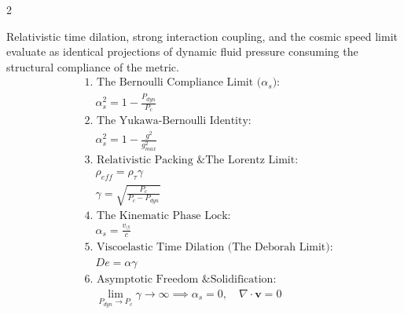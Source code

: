 \documentclass[11pt, a4paper]{article}
\newcounter{cheatnum}
\begin{document}
\begin{multicols}{2}
\begin{tcolorbox}[cheatbox, title={\refstepcounter{cheatnum}\label{box:viscoelastic_stiffening}\thecheatnum. Viscoelastic Phase Stiffening \& Time Dilation \scriptsize\hfill\hyperref[sec:deriv_viscoelastic_stiffening]{[Proof $\downarrow$]}}]
Relativistic time dilation, strong interaction coupling, and the cosmic speed limit evaluate as identical projections of dynamic fluid pressure consuming the structural compliance of the metric.
\begin{align}
    &\text{1. The Bernoulli Compliance Limit ($\alpha_s$):} \nonumber \\
    &\quad \alpha_s^2 = 1 - \frac{P_{dyn}}{P_c} \label{eq:admittance_pressure_ratio} \\
    &\text{2. The Yukawa-Bernoulli Identity:} \nonumber \\
    &\quad \alpha_s^2 = 1 - \frac{g^2}{g_{max}^2} \label{eq:yukawa_identity} \\
    &\text{3. Relativistic Packing \& The Lorentz Limit:} \nonumber \\
    &\quad \rho_{eff} = \rho_{\tau} \gamma \label{eq:relativistic_packing_admittance} \\
    &\quad \gamma = \sqrt{\frac{P_c}{P_c - P_{dyn}}} \label{eq:lorentz_pressure} \\
    &\text{4. The Kinematic Phase Lock:} \nonumber \\
    &\quad \alpha_s = \frac{v_{\circlearrowleft}}{c} \label{eq:admittance_spin_identity} \\
    &\text{5. Viscoelastic Time Dilation (The Deborah Limit):} \nonumber \\
    &\quad De = \alpha \gamma \label{eq:kinematic_deborah} \\
    &\text{6. Asymptotic Freedom \& Solidification:} \nonumber \\
    &\quad \lim_{P_{dyn} \to P_c} \gamma \to \infty \implies \alpha_s = 0, \quad \nabla \cdot \mathbf{v} = 0 \label{eq:cavitation_collapse}
\end{align}
\end{tcolorbox}



\end{multicols}
\end{document}
